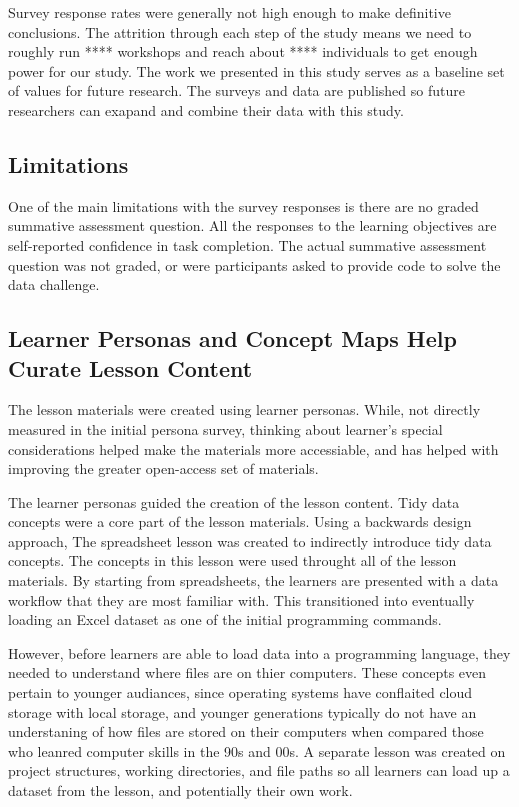 \documentclass[020-persona_validation.tex]{subfiles}
\begin{document}
    Survey response rates were generally not high enough to make definitive conclusions.
    The attrition through each step of the study means we need to roughly run ****
    workshops and reach about **** individuals to get enough power for our study.
    The work we presented in this study serves as a baseline set of values for future research.
    The surveys and data are published so future researchers can exapand and combine their
    data with this study.

    \subsection{Limitations}

        One of the main limitations with the survey responses is there
        are no graded summative assessment question.
        All the responses to the learning objectives are self-reported confidence in task completion.
        The actual summative assessment question was not graded,
        or were participants asked to provide code to solve the data challenge.

    \subsection{Learner Personas and Concept Maps Help Curate Lesson Content}

        The lesson materials were created using learner personas.
        While, not directly measured in the initial persona survey,
        thinking about learner's special considerations helped make the materials
        more accessiable,
        and has helped with improving the greater open-access set of materials.

        The learner personas guided the creation of the lesson content.
        Tidy data concepts were a core part of the lesson materials.
        Using a backwards design approach,
        The spreadsheet lesson was created to indirectly introduce tidy data concepts.
        The concepts in this lesson were used throught all of the lesson materials.
        By starting from spreadsheets,
        the learners are presented with a data workflow that they are most familiar with.
        This transitioned into eventually loading an Excel dataset as one of the initial programming commands.

        However, before learners are able to load data into a programming language,
        they needed to understand where files are on thier computers.
        These concepts even pertain to younger audiances,
        since operating systems have conflaited cloud storage with local storage,
        and younger generations typically do not have an understaning of how files are stored on their computers
        when compared those who leanred computer skills in the 90s and 00s. %
        A separate lesson was created on project structures, working directories, and file paths
        so all learners can load up a dataset from the lesson, and potentially their own work.
\end{document}
